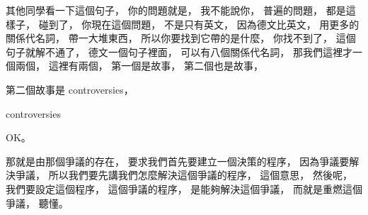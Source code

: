 \hypertarget{w06:cue:1956}{}其他同學看一下這個句子，
\hypertarget{w06:cue:1957}{}你的問題就是，
\hypertarget{w06:cue:1958}{}我不能說你，
\hypertarget{w06:cue:1959}{}普遍的問題，
\hypertarget{w06:cue:1960}{}都是這樣子，
\hypertarget{w06:cue:1961}{}碰到了，
\hypertarget{w06:cue:1962}{}你現在這個問題，
\hypertarget{w06:cue:1963}{}不是只有英文，
\hypertarget{w06:cue:1964}{}因為德文比英文，
\hypertarget{w06:cue:1965}{}用更多的關係代名詞，
\hypertarget{w06:cue:1966}{}帶一大堆東西，
\hypertarget{w06:cue:1967}{}所以你要找到它帶的是什麼，
\hypertarget{w06:cue:1968}{}你找不到了，
\hypertarget{w06:cue:1969}{}這個句子就解不通了，
\hypertarget{w06:cue:1970}{}德文一個句子裡面，
\hypertarget{w06:cue:1971}{}可以有八個關係代名詞，
\hypertarget{w06:cue:1972}{}那我們這裡才一個兩個，
\hypertarget{w06:cue:1973}{}這裡有兩個，
\hypertarget{w06:cue:1974}{}第一個是故事，
\hypertarget{w06:cue:1975}{}第二個也是故事，

\hypertarget{w06:cue:1976}{}第二個故事是 controversies，

\hypertarget{w06:cue:1977}{}controversies

\hypertarget{w06:cue:1978}{}OK。

\hypertarget{w06:cue:1979}{}那就是由那個爭議的存在，
\hypertarget{w06:cue:1980}{}要求我們首先要建立一個決策的程序，
\hypertarget{w06:cue:1981}{}因為爭議要解決爭議，
\hypertarget{w06:cue:1982}{}所以我們要先講我們怎麼解決這個爭議的程序，
\hypertarget{w06:cue:1983}{}這個意思，
\hypertarget{w06:cue:1984}{}然後呢，
\hypertarget{w06:cue:1985}{}我們要設定這個程序，
\hypertarget{w06:cue:1986}{}這個爭議的程序，
\hypertarget{w06:cue:1987}{}是能夠解決這個爭議，
\hypertarget{w06:cue:1988}{}而就是重燃這個爭議，
\hypertarget{w06:cue:1989}{}聽懂。

